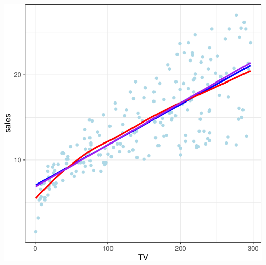 \documentclass[
]{article}
\begin{document}
\begin{center}\includegraphics{SDM-CHAP24_files/figure-latex/ggp-1} \end{center}
\end{document}
